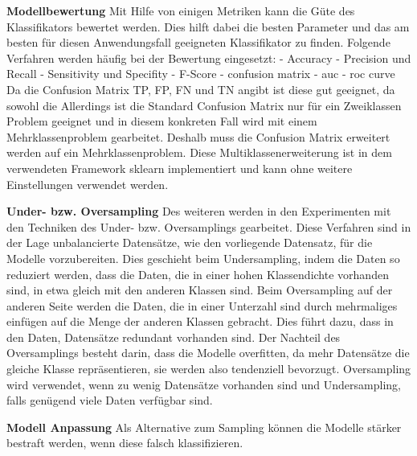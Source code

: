 

\textbf{Modellbewertung}
Mit Hilfe von einigen Metriken kann die Güte des Klassifikators bewertet werden.
Dies hilft dabei die besten Parameter und das am besten für diesen Anwendungsfall geeigneten Klassifikator zu finden.
Folgende Verfahren werden häufig bei der Bewertung eingesetzt:
- Accuracy
- Precision und Recall
- Sensitivity und Specifity
- F-Score
- confusion matrix
- auc - roc curve \\
Da die Confusion Matrix TP, FP, FN und TN angibt ist diese gut geeignet, da sowohl die 
Allerdings ist die Standard Confusion Matrix nur für ein Zweiklassen Problem geeignet und in diesem konkreten Fall wird mit einem Mehrklassenproblem gearbeitet.
Deshalb muss die Confusion Matrix erweitert werden auf ein Mehrklassenproblem.
Diese Multiklassenerweiterung ist in dem verwendeten Framework sklearn implementiert und kann ohne weitere Einstellungen verwendet werden.

\textbf{Under- bzw. Oversampling}
Des weiteren werden in den Experimenten mit den Techniken des Under- bzw. Oversamplings gearbeitet. 
Diese Verfahren sind in der Lage unbalancierte Datensätze, wie den vorliegende Datensatz, für die Modelle vorzubereiten. 
Dies geschieht beim Undersampling, indem die Daten so reduziert werden, dass die Daten, die in einer hohen Klassendichte vorhanden sind, in etwa gleich mit den anderen Klassen sind. 
Beim Oversampling auf der anderen Seite werden die Daten, die in einer Unterzahl sind durch mehrmaliges einfügen auf die Menge der anderen Klassen gebracht. 
Dies führt dazu, dass in den Daten, Datensätze redundant vorhanden sind. 
\cite{ML 3.6.3 Sampling}
Der Nachteil des Oversamplings besteht darin, dass die Modelle overfitten, da mehr Datensätze die gleiche Klasse repräsentieren, sie werden also tendenziell bevorzugt. 
\cite{ML 4.4.4 Tree Pruning}
Oversampling wird verwendet, wenn zu wenig Datensätze vorhanden sind und Undersampling, falls genügend viele Daten verfügbar sind. 

\textbf{Modell Anpassung}
Als Alternative zum Sampling können die Modelle stärker bestraft werden, wenn diese falsch klassifizieren. 


